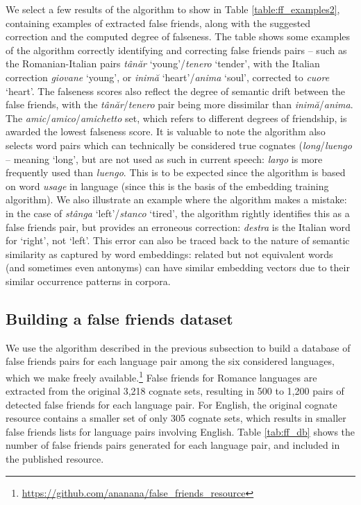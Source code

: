 \documentclass[output=paper]{langsci/langscibook}
\begin{document}
We select a few results of the algorithm to show in Table \ref{table:ff_examples2}, containing examples of extracted false friends, along with the suggested correction and the computed degree of falseness.
The table shows some examples of the algorithm correctly identifying and correcting false friends pairs -- such as the Romanian-Italian pairs \textit{tânăr} `young'\slash\textit{tenero} `tender', with the Italian correction \textit{giovane} `young', or \textit{inimă} `heart'\slash\textit{anima} `soul', corrected to \textit{cuore} `heart'. The falseness scores also reflect the degree of semantic drift between the false friends, with the \textit{tânăr}\slash\textit{tenero} pair being more dissimilar than \textit{inimă}\slash\textit{anima}. The \textit{amic}\slash\textit{amico}\slash\textit{amichetto} set, which refers to different degrees of friendship, is awarded the lowest falseness score.
It is valuable to note the algorithm also selects word pairs which can technically be considered true cognates (\textit{long}\slash\textit{luengo} -- meaning `long', but are not used as such in current speech: \textit{largo} is more frequently used than \textit{luengo}.\largerpage{} This is to be expected since the algorithm is based on word \textit{usage} in language (since this is the basis of the embedding training algorithm). 
We also illustrate an example where the algorithm makes a mistake: in the case of \textit{stânga} `left'\slash\textit{stanco} `tired', the algorithm rightly identifies this as a false friends pair, but provides an erroneous correction: \textit{destra} is the Italian word for `right', not `left'. This error can also be traced back to the nature of semantic similarity as captured by word embeddings: related but not equivalent words (and sometimes even antonyms) can have similar embedding vectors due to their similar occurrence patterns in corpora.

\subsection{Building a false friends dataset}

We use the algorithm described in the previous subsection to build a database of false friends pairs for each language pair among the six considered languages, which we make freely available.\footnote{\url{https://github.com/ananana/false\_friends_resource}}
False friends for Romance languages are extracted from the original 3,218 cognate sets, resulting in 500 to 1,200 pairs of detected false friends for each language pair. For English, the original cognate resource contains a smaller set of only 305 cognate sets, which results in smaller false friends lists for language pairs involving English.
Table \ref{tab:ff_db} shows the number of false friends pairs generated for each language pair, and included in the published resource.
\end{document}
